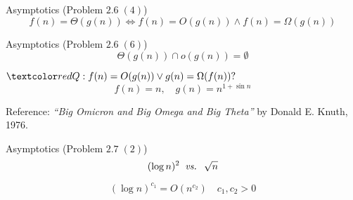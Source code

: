 \begin{frame}{}
  \begin{exampleblock}{Asymptotics (Problem $2.6\; (4)$)}
    \[
      f(n) = \Theta(g(n)) \iff f(n) = O(g(n)) \land f(n) = \Omega(g(n))
    \]
  \end{exampleblock}


  \pause
  \vspace{0.50cm}
  \begin{exampleblock}{Asymptotics (Problem $2.6\; (6)$)}
    \[
      \Theta(g(n)) \cap o(g(n)) = \emptyset
    \]
  \end{exampleblock}

  \pause
  \vspace{0.50cm}
  \begin{alertblock}{$\red{Q:}\; f(n) = O(g(n)) \lor g(n) = \Omega(f(n)) ?$}
    \pause
    \[
      f(n) = n, \quad g(n) = n^{1 + \sin n}
    \]
  \end{alertblock}

  \pause
  \vspace{0.20cm}
  \begin{alertblock}{Reference:}
    {\it ``Big Omicron and Big Omega and Big Theta''} by Donald E. Knuth, 1976.
  \end{alertblock}
\end{frame}

\begin{frame}{}
  \begin{exampleblock}{Asymptotics (Problem $2.7\; (2)$)}
    \[
      (\log n)^{2} \;\;\text{\it vs. }\; \sqrt{n}
    \]
  \end{exampleblock}

  \pause
  \[
    (\log n)^{c_1} = O(n^{c_2}) \quad c_1, c_2 > 0
  \]
\end{frame}

